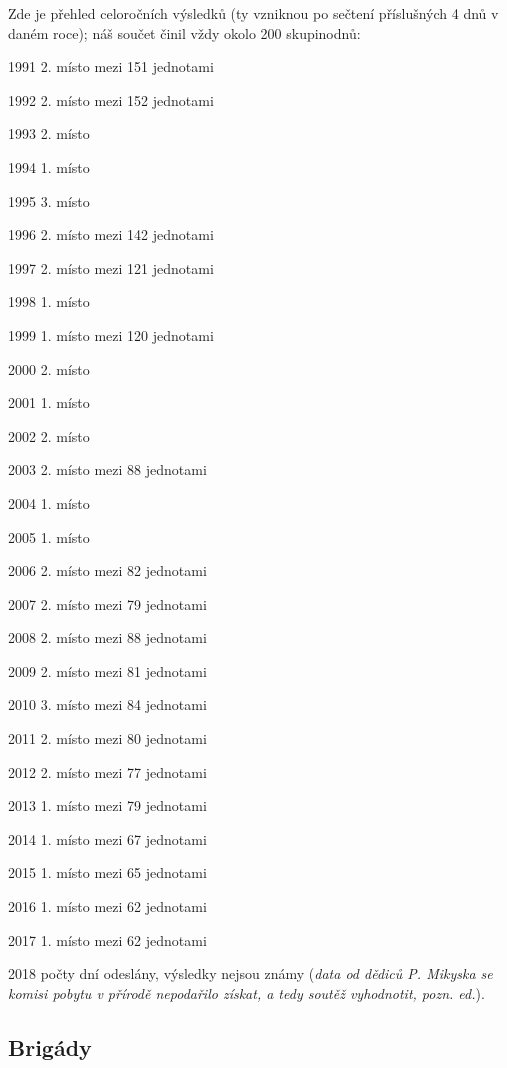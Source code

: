 Zde je přehled celoročních výsledků (ty vzniknou po sečtení příslušných
4 dnů v daném roce); náš součet činil vždy okolo 200 skupinodnů:

1991 2. místo mezi 151 jednotami

1992 2. místo mezi 152 jednotami

1993 2. místo

1994 1. místo

1995 3. místo

1996 2. místo mezi 142 jednotami

1997 2. místo mezi 121 jednotami

1998 1. místo

1999 1. místo mezi 120 jednotami

2000 2. místo

2001 1. místo

2002 2. místo

2003 2. místo mezi 88 jednotami

2004 1. místo

2005 1. místo

2006 2. místo mezi 82 jednotami

2007 2. místo mezi 79 jednotami

2008 2. místo mezi 88 jednotami

2009 2. místo mezi 81 jednotami

2010 3. místo mezi 84 jednotami

2011 2. místo mezi 80 jednotami

2012 2. místo mezi 77 jednotami

2013 1. místo mezi 79 jednotami

2014 1. místo mezi 67 jednotami

2015 1. místo mezi 65 jednotami

2016 1. místo mezi 62 jednotami

2017 1. místo mezi 62 jednotami

2018 počty dní odeslány, výsledky nejsou známy (\emph{data od dědiců P.
Mikyska se komisi pobytu v přírodě nepodařilo získat, a tedy soutěž
vyhodnotit, pozn. ed.}).

\subsection{Brigády}\label{briguxe1dy}

